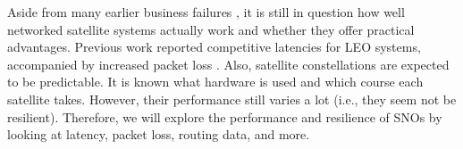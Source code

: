 Aside from many earlier business failures \cite{Chan2002, Barboza2000}, it is
still in question how well networked satellite systems actually work and
whether they offer practical advantages. Previous work reported competitive
latencies for \ac{LEO} systems, accompanied by increased packet loss
\cite{DBLP:conf/imc/MichelTGB22}. Also, satellite constellations are expected
to be predictable. It is known what hardware is used and which course each
satellite takes. However, their performance still varies a lot (i.e., they seem
not be resilient). Therefore, we will explore the performance and resilience of
\ac{SNO}s by looking at latency, packet loss, routing data, and more.
